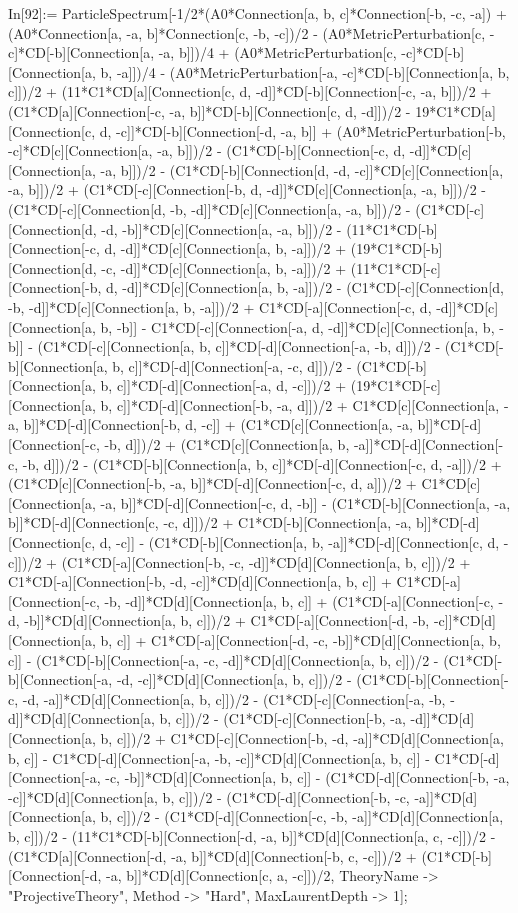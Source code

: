 In[92]:= ParticleSpectrum[-1/2*(A0*Connection[a, b, c]*Connection[-b, -c, -a]) + (A0*Connection[a, -a, b]*Connection[c, -b, -c])/2 - (A0*MetricPerturbation[c, -c]*CD[-b][Connection[a, -a, b]])/4 + (A0*MetricPerturbation[c, -c]*CD[-b][Connection[a, b, -a]])/4 - (A0*MetricPerturbation[-a, -c]*CD[-b][Connection[a, b, c]])/2 + (11*C1*CD[a][Connection[c, d, -d]]*CD[-b][Connection[-c, -a, b]])/2 + (C1*CD[a][Connection[-c, -a, b]]*CD[-b][Connection[c, d, -d]])/2 - 19*C1*CD[a][Connection[c, d, -c]]*CD[-b][Connection[-d, -a, b]] + (A0*MetricPerturbation[-b, -c]*CD[c][Connection[a, -a, b]])/2 - (C1*CD[-b][Connection[-c, d, -d]]*CD[c][Connection[a, -a, b]])/2 - (C1*CD[-b][Connection[d, -d, -c]]*CD[c][Connection[a, -a, b]])/2 + (C1*CD[-c][Connection[-b, d, -d]]*CD[c][Connection[a, -a, b]])/2 - (C1*CD[-c][Connection[d, -b, -d]]*CD[c][Connection[a, -a, b]])/2 - (C1*CD[-c][Connection[d, -d, -b]]*CD[c][Connection[a, -a, b]])/2 - (11*C1*CD[-b][Connection[-c, d, -d]]*CD[c][Connection[a, b, -a]])/2 + (19*C1*CD[-b][Connection[d, -c, -d]]*CD[c][Connection[a, b, -a]])/2 + (11*C1*CD[-c][Connection[-b, d, -d]]*CD[c][Connection[a, b, -a]])/2 - (C1*CD[-c][Connection[d, -b, -d]]*CD[c][Connection[a, b, -a]])/2 + C1*CD[-a][Connection[-c, d, -d]]*CD[c][Connection[a, b, -b]] - C1*CD[-c][Connection[-a, d, -d]]*CD[c][Connection[a, b, -b]] - (C1*CD[-c][Connection[a, b, c]]*CD[-d][Connection[-a, -b, d]])/2 - (C1*CD[-b][Connection[a, b, c]]*CD[-d][Connection[-a, -c, d]])/2 - (C1*CD[-b][Connection[a, b, c]]*CD[-d][Connection[-a, d, -c]])/2 + (19*C1*CD[-c][Connection[a, b, c]]*CD[-d][Connection[-b, -a, d]])/2 + C1*CD[c][Connection[a, -a, b]]*CD[-d][Connection[-b, d, -c]] + (C1*CD[c][Connection[a, -a, b]]*CD[-d][Connection[-c, -b, d]])/2 + (C1*CD[c][Connection[a, b, -a]]*CD[-d][Connection[-c, -b, d]])/2 - (C1*CD[-b][Connection[a, b, c]]*CD[-d][Connection[-c, d, -a]])/2 + (C1*CD[c][Connection[-b, -a, b]]*CD[-d][Connection[-c, d, a]])/2 + C1*CD[c][Connection[a, -a, b]]*CD[-d][Connection[-c, d, -b]] - (C1*CD[-b][Connection[a, -a, b]]*CD[-d][Connection[c, -c, d]])/2 + C1*CD[-b][Connection[a, -a, b]]*CD[-d][Connection[c, d, -c]] - (C1*CD[-b][Connection[a, b, -a]]*CD[-d][Connection[c, d, -c]])/2 + (C1*CD[-a][Connection[-b, -c, -d]]*CD[d][Connection[a, b, c]])/2 + C1*CD[-a][Connection[-b, -d, -c]]*CD[d][Connection[a, b, c]] + C1*CD[-a][Connection[-c, -b, -d]]*CD[d][Connection[a, b, c]] + (C1*CD[-a][Connection[-c, -d, -b]]*CD[d][Connection[a, b, c]])/2 + C1*CD[-a][Connection[-d, -b, -c]]*CD[d][Connection[a, b, c]] + C1*CD[-a][Connection[-d, -c, -b]]*CD[d][Connection[a, b, c]] - (C1*CD[-b][Connection[-a, -c, -d]]*CD[d][Connection[a, b, c]])/2 - (C1*CD[-b][Connection[-a, -d, -c]]*CD[d][Connection[a, b, c]])/2 - (C1*CD[-b][Connection[-c, -d, -a]]*CD[d][Connection[a, b, c]])/2 - (C1*CD[-c][Connection[-a, -b, -d]]*CD[d][Connection[a, b, c]])/2 - (C1*CD[-c][Connection[-b, -a, -d]]*CD[d][Connection[a, b, c]])/2 + C1*CD[-c][Connection[-b, -d, -a]]*CD[d][Connection[a, b, c]] - C1*CD[-d][Connection[-a, -b, -c]]*CD[d][Connection[a, b, c]] - C1*CD[-d][Connection[-a, -c, -b]]*CD[d][Connection[a, b, c]] - (C1*CD[-d][Connection[-b, -a, -c]]*CD[d][Connection[a, b, c]])/2 - (C1*CD[-d][Connection[-b, -c, -a]]*CD[d][Connection[a, b, c]])/2 - (C1*CD[-d][Connection[-c, -b, -a]]*CD[d][Connection[a, b, c]])/2 - (11*C1*CD[-b][Connection[-d, -a, b]]*CD[d][Connection[a, c, -c]])/2 - (C1*CD[a][Connection[-d, -a, b]]*CD[d][Connection[-b, c, -c]])/2 + (C1*CD[-b][Connection[-d, -a, b]]*CD[d][Connection[c, a, -c]])/2, TheoryName -> "ProjectiveTheory", Method -> "Hard", MaxLaurentDepth -> 1]; 